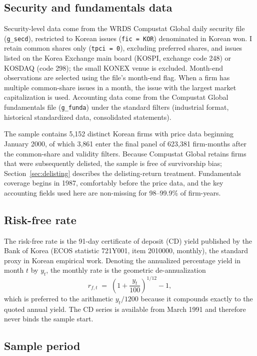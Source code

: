 \documentclass[11pt]{article}
\begin{document}
\subsection{Security and fundamentals data}

Security-level data come from the WRDS Compustat Global daily security file (\texttt{g\_secd}), restricted to Korean issues (\texttt{fic = KOR}) denominated in Korean won. I retain common shares only (\texttt{tpci = 0}), excluding preferred shares, and issues listed on the Korea Exchange main board (KOSPI, exchange code 248) or KOSDAQ (code 298); the small KONEX venue is excluded. Month-end observations are selected using the file's month-end flag. When a firm has multiple common-share issues in a month, the issue with the largest market capitalization is used. Accounting data come from the Compustat Global fundamentals file (\texttt{g\_funda}) under the standard filters (industrial format, historical standardized data, consolidated statements).

The sample contains 5{,}152 distinct Korean firms with price data beginning January 2000, of which 3{,}861 enter the final panel of 623{,}381 firm-months after the common-share and validity filters. Because Compustat Global retains firms that were subsequently delisted, the sample is free of survivorship bias; Section~\ref{sec:delisting} describes the delisting-return treatment. Fundamentals coverage begins in 1987, comfortably before the price data, and the key accounting fields used here are non-missing for 98--99.9\% of firm-years.

\subsection{Risk-free rate}

The risk-free rate is the 91-day certificate of deposit (CD) yield published by the Bank of Korea (ECOS statistic 721Y001, item 2010000, monthly), the standard proxy in Korean empirical work. Denoting the annualized percentage yield in month $t$ by $y_t$, the monthly rate is the geometric de-annualization
\begin{equation}
r_{f,t} \;=\; \left(1+\frac{y_t}{100}\right)^{1/12} - 1,
\label{eq:rf}
\end{equation}
which is preferred to the arithmetic $y_t/1200$ because it compounds exactly to the quoted annual yield. The CD series is available from March 1991 and therefore never binds the sample start.

\subsection{Sample period}
\end{document}
